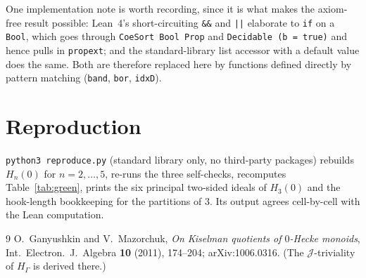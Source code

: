 \documentclass[11pt]{article}
\begin{document}
One implementation note is worth recording, since it is what makes the
axiom-free result possible: Lean~4's short-circuiting \texttt{\&\&} and
\texttt{||} elaborate to \texttt{if} on a \texttt{Bool}, which goes through
\texttt{CoeSort Bool Prop} and \texttt{Decidable (b = true)} and hence pulls in
\texttt{propext}; and the standard-library list accessor with a default value
does the same.  Both are therefore replaced here by functions defined directly
by pattern matching (\texttt{band}, \texttt{bor}, \texttt{idxD}).

\section{Reproduction}

\texttt{python3 reproduce.py} (standard library only, no third-party packages)
rebuilds $H_n(0)$ for $n = 2,\dots,5$, re-runs the three self-checks, recomputes
Table~\ref{tab:green}, prints the six principal two-sided ideals of $H_3(0)$ and
the hook-length bookkeeping for the partitions of $3$.  Its output agrees
cell-by-cell with the Lean computation.

\begin{thebibliography}{9}
O.~Ganyushkin and V.~Mazorchuk,
\emph{On Kiselman quotients of $0$-Hecke monoids},
Int.\ Electron.\ J.\ Algebra \textbf{10} (2011), 174--204;
arXiv:1006.0316.  (The $\mathcal{J}$-triviality of $H_\Gamma$ is derived there.)
\end{thebibliography}
\end{document}
